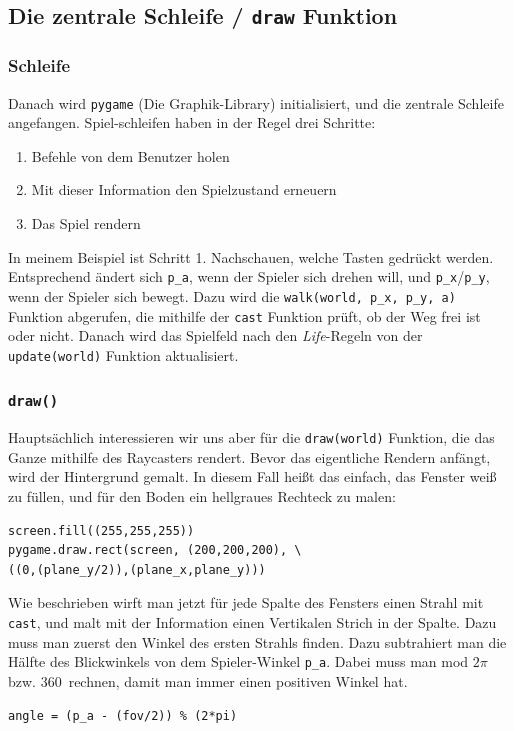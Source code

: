 \documentclass[a4paper,12pt]{report}
\begin{document}
\subsection{Die zentrale Schleife / \texttt{draw} Funktion}
\subsubsection{Schleife}
Danach wird \texttt{pygame} (Die Graphik-Library) initialisiert, und die zentrale Schleife angefangen. Spiel-schleifen haben in der Regel drei Schritte:
\begin{enumerate}
	\item Befehle von dem Benutzer holen
	\item Mit dieser Information den Spielzustand erneuern
	\item Das Spiel rendern
\end{enumerate}
In meinem Beispiel ist Schritt 1. Nachschauen, welche Tasten gedr\"uckt werden. Entsprechend ändert sich \texttt{p\_a}, wenn der Spieler sich drehen will, und \texttt{p\_x}/\texttt{p\_y}, wenn der Spieler sich bewegt. Dazu wird die \texttt{walk(world, p\_x, p\_y, a)} Funktion abgerufen, die mithilfe der \texttt{cast} Funktion prüft, ob der Weg frei ist oder nicht. Danach wird das Spielfeld nach den \textit{Life}-Regeln von der \texttt{update(world)} Funktion aktualisiert.

\subsubsection{\texttt{draw()}}
Hauptsächlich interessieren wir uns aber für die \texttt{draw(world)} Funktion, die das Ganze mithilfe des Raycasters rendert. Bevor das eigentliche Rendern anfängt, wird der Hintergrund gemalt. In diesem Fall heißt das einfach, das Fenster weiß zu füllen, und für den Boden ein hellgraues Rechteck zu malen:
\begin{Verbatim}[baselinestretch=1.0, xleftmargin=1cm]
screen.fill((255,255,255))
pygame.draw.rect(screen, (200,200,200), \
((0,(plane_y/2)),(plane_x,plane_y)))
\end{Verbatim}

Wie beschrieben wirft man jetzt für jede Spalte des Fensters einen Strahl mit \texttt{cast}, und malt mit der Information einen Vertikalen Strich in der Spalte. Dazu muss man zuerst den Winkel des ersten Strahls finden. Dazu subtrahiert man die Hälfte des Blickwinkels von dem Spieler-Winkel \texttt{p\_a}. Dabei muss man mod $2\pi$ bzw. 360\textdegree\ rechnen, damit man immer einen positiven Winkel hat.
\begin{Verbatim}[baselinestretch=1.0, xleftmargin=1cm]
angle = (p_a - (fov/2)) % (2*pi)
\end{Verbatim}
\end{document}
